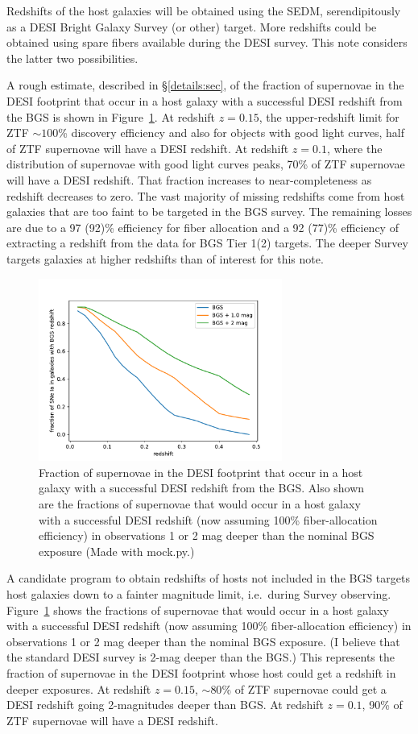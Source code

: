 \documentclass{article}   	%
\begin{document}
Redshifts of the host galaxies will be obtained using the SEDM, serendipitously as a DESI Bright Galaxy Survey (or other) target.
More redshifts could be obtained using spare fibers available during the DESI survey.  This note considers the latter two possibilities.

A rough estimate, described in \S\ref{details:sec},
of the fraction of supernovae in the DESI footprint
that occur in a host galaxy with a successful DESI redshift from the BGS is shown in Figure~\ref{19.5:fig}.
At redshift $z=0.15$, the upper-redshift limit for ZTF $\sim 100$\% discovery efficiency and also for objects with good light curves, half of ZTF supernovae will have a DESI redshift.
At redshift $z=0.1$, where the distribution of supernovae with good light curves peaks, 70\% of ZTF supernovae will have a DESI redshift.
That fraction increases to near-completeness as redshift decreases to zero.
The vast majority of missing redshifts come from
host galaxies that are too faint to be targeted in the BGS survey.
The remaining losses are due to
a 97 (92)\% efficiency for fiber allocation and a 92 (77)\% efficiency of extracting a redshift from the data for BGS Tier 1(2) targets. 
The deeper Survey targets
galaxies at higher redshifts than of interest for this note.

\begin{figure}[h]
\includegraphics[width=8cm]{bg_frac.pdf}
\centering
\caption{Fraction of supernovae in the DESI footprint
that occur in a host galaxy with a successful DESI redshift from the BGS.  Also shown are  the fractions of supernovae that would occur in a host galaxy
with a successful DESI redshift (now assuming 100\% fiber-allocation efficiency) in observations 1 or 2 mag deeper than the nominal BGS exposure
(Made with  mock.py.)
\label{19.5:fig}}
\end{figure}



A candidate program to obtain redshifts of hosts not included in the BGS targets host galaxies down to a fainter magnitude limit, i.e.\ during Survey observing.
Figure~\ref{19.5:fig} shows the fractions of supernovae that would occur in a host galaxy
with a successful DESI redshift (now assuming 100\% fiber-allocation efficiency) in observations 1 or 2 mag deeper than the nominal BGS exposure.
(I believe that the standard DESI survey is 2-mag deeper than the BGS.)
This represents the fraction of supernovae in the DESI footprint
whose host could get a redshift in deeper exposures.
At redshift $z=0.15$,  $\sim 80$\% of ZTF supernovae could get a DESI redshift going 2-magnitudes deeper than BGS.
At redshift $z=0.1$, 90\% of ZTF supernovae will have a DESI redshift.
\end{document}
